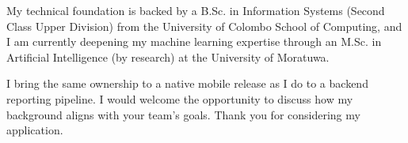 \documentclass[11pt]{article}
\begin{document}
My technical foundation is backed by a B.Sc. in Information Systems (Second Class Upper Division) from the University of Colombo School of Computing, and I am currently deepening my machine learning expertise through an M.Sc. in Artificial Intelligence (by research) at the University of Moratuwa.

I bring the same ownership to a native mobile release as I do to a backend reporting pipeline. I would welcome the opportunity to discuss how my background aligns with your team's goals. Thank you for considering my application.

\end{document}
